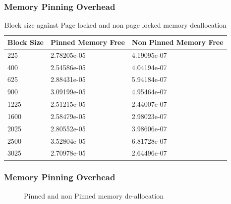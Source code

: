 \documentclass{beamer}
\begin{document}
\begin{frame}[fragile]
  \frametitle{Memory Pinning Overhead}
  \begin{table}[h]
    \centering
    \begin{tabular}{l<{\onslide<2->} | l<{\onslide<3->} | l<{\onslide}}
      \hline
      Block Size & Pinned Memory Free & Non Pinned Memory Free \\
      \hline
      225        & 2.78205e-05        & 4.19095e-07            \\
      400        & 2.54586e-05        & 4.04194e-07            \\
      625        & 2.88431e-05        & 5.94184e-07            \\
      900        & 3.09199e-05        & 4.95464e-07            \\
      1225       & 2.51215e-05        & 2.44007e-07            \\
      1600       & 2.58479e-05        & 2.98023e-07            \\
      2025       & 2.80552e-05        & 3.98606e-07            \\
      2500       & 3.52804e-05        & 6.81728e-07            \\
      3025       & 2.70978e-05        & 2.64496e-07            \\
      \hline
    \end{tabular}
    \caption{Block size against Page locked and non page locked memory deallocation}
    \label{tab:mempin_free}
  \end{table}
\end{frame}

\begin{frame}[fragile]
  \frametitle{Memory Pinning Overhead}
  \begin{figure}[h]
    \resizebox{.9\linewidth}{!}{}
    \caption{Pinned and non Pinned memory de-allocation}
  \end{figure}
\end{frame}
\end{document}
